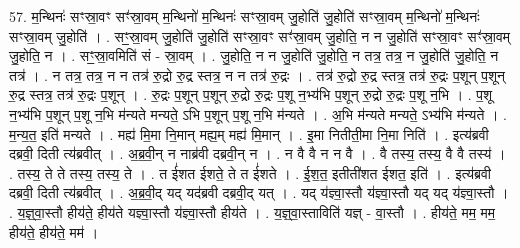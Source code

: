 \documentclass[17pt]{extarticle}
\begin{document}
57. म॒न्थिनः॑ सꣳस्रा॒वꣳ सꣳ॑स्रा॒वम् म॒न्थिनो॑ म॒न्थिनः॑ सꣳस्रा॒वम् जु॒होति॑ जु॒होति॑ सꣳस्रा॒वम् म॒न्थिनो॑ म॒न्थिनः॑ सꣳस्रा॒वम् जु॒होति॑ । . सꣳ॒॒स्रा॒वम् जु॒होति॑ जु॒होति॑ सꣳस्रा॒वꣳ सꣳ॑स्रा॒वम् जु॒होति॒ न न जु॒होति॑ सꣳस्रा॒वꣳ सꣳ॑स्रा॒वम् जु॒होति॒ न । . सꣳ॒॒स्रा॒वमिति॑ सं - स्रा॒वम् । . जु॒होति॒ न न जु॒होति॑ जु॒होति॒ न तत्र॒ तत्र॒ न जु॒होति॑ जु॒होति॒ न तत्र॑ । . न तत्र॒ तत्र॒ न न तत्र॑ रु॒द्रो रु॒द्र स्तत्र॒ न न तत्र॑ रु॒द्रः । . तत्र॑ रु॒द्रो रु॒द्र स्तत्र॒ तत्र॑ रु॒द्रः प॒शून् प॒शून् रु॒द्र स्तत्र॒ तत्र॑ रु॒द्रः प॒शून् । . रु॒द्रः प॒शून् प॒शून् रु॒द्रो रु॒द्रः प॒शू न॒भ्य॑भि प॒शून् रु॒द्रो रु॒द्रः प॒शू न॒भि । . प॒शू न॒भ्य॑भि प॒शून् प॒शू न॒भि म॑न्यते मन्यते॒ ऽभि प॒शून् प॒शू न॒भि म॑न्यते । . अ॒भि म॑न्यते मन्यते॒ ऽभ्य॑भि म॑न्यते । . म॒न्य॒त॒ इति॑ मन्यते । . मह्य॑ मि॒मा नि॒मान् मह्य॒म् मह्य॑ मि॒मान् । . इ॒मा नितीती॒मा नि॒मा निति॑ । . इत्य॑ब्रवी दब्रवी॒ दिती त्य॑ब्रवीत् । . अ॒ब्र॒वी॒न् न नाब्र॑वी दब्रवी॒न् न । . न वै वै न न वै । . वै तस्य॒ तस्य॒ वै वै तस्य॑ । . तस्य॒ ते ते तस्य॒ तस्य॒ ते । . त ई॑शत ईशते॒ ते त ई॑शते । . ई॒श॒त॒ इतीती॑शत ईशत॒ इति॑ । . इत्य॑ब्रवी दब्रवी॒ दिती त्य॑ब्रवीत् । . अ॒ब्र॒वी॒द् यद् यद॑ब्रवी दब्रवी॒द् यत् । . यद् य॑ज्ञ्वा॒स्तौ य॑ज्ञ्वा॒स्तौ यद् यद् य॑ज्ञ्वा॒स्तौ । . य॒ज्ञ्॒वा॒स्तौ हीय॑ते॒ हीय॑ते यज्ञ्वा॒स्तौ य॑ज्ञ्वा॒स्तौ हीय॑ते । . य॒ज्ञ्॒वा॒स्ताविति॑ यज्ञ् - वा॒स्तौ । . हीय॑ते॒ मम॒ मम॒ हीय॑ते॒ हीय॑ते॒ मम॑ । \newline
\end{document}
